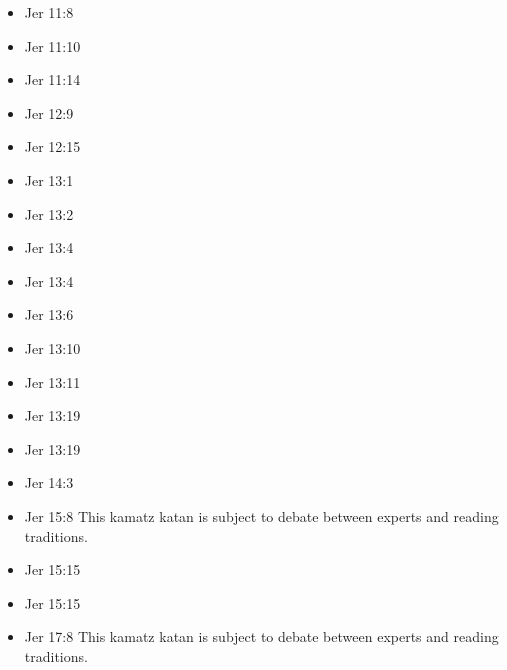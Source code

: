 \documentclass[14pt]{book}
\begin{document}
\begin{multicols}{2}
\begin{itemize}
						\item Jer 11:8
						
						\item Jer 11:10
						
						\item Jer 11:14
						
						\item Jer 12:9
						
						\item Jer 12:15
						
						\item Jer 13:1
						
						\item Jer 13:2
						
						\item Jer 13:4
						
						\item Jer 13:4
						
						\item Jer 13:6
						
						\item Jer 13:10
						
						\item Jer 13:11
						
						\item Jer 13:19
						
						\item Jer 13:19
						
						\item Jer 14:3
						
						\item Jer 15:8 This kamatz katan is subject to debate between experts and reading traditions.
						
						\item Jer 15:15
						
						\item Jer 15:15
						
						\item Jer 17:8 This kamatz katan is subject to debate between experts and reading traditions.
						

\end{itemize}
\end{multicols}
\end{document}
